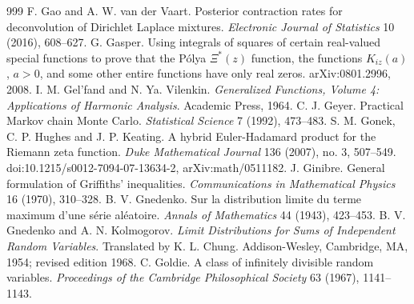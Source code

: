 \begin{thebibliography}{999}
 F. Gao and A. W. van der Vaart. Posterior contraction rates for deconvolution of Dirichlet Laplace mixtures. \emph{Electronic Journal of Statistics} 10 (2016), 608--627.
 G. Gasper. Using integrals of squares of certain real-valued special functions to prove that the P\'olya $\Xi^*(z)$ function, the functions $K_{iz}(a)$, $a>0$, and some other entire functions have only real zeros. arXiv:0801.2996, 2008.
 I. M. Gel'fand and N. Ya. Vilenkin. \emph{Generalized Functions, Volume 4: Applications of Harmonic Analysis}. Academic Press, 1964.
 C. J. Geyer. Practical Markov chain Monte Carlo. \emph{Statistical Science} 7 (1992), 473--483.
 S. M. Gonek, C. P. Hughes and J. P. Keating. A hybrid Euler-Hadamard product for the Riemann zeta function. \emph{Duke Mathematical Journal} 136 (2007), no. 3, 507--549. doi:10.1215/s0012-7094-07-13634-2, arXiv:math/0511182.
 J. Ginibre. General formulation of Griffiths' inequalities. \emph{Communications in Mathematical Physics} 16 (1970), 310--328.
 B. V. Gnedenko. Sur la distribution limite du terme maximum d'une s\'erie al\'eatoire. \emph{Annals of Mathematics} 44 (1943), 423--453.
 B. V. Gnedenko and A. N. Kolmogorov. \emph{Limit Distributions for Sums of Independent Random Variables}. Translated by K. L. Chung. Addison-Wesley, Cambridge, MA, 1954; revised edition 1968.
 C. Goldie. A class of infinitely divisible random variables. \emph{Proceedings of the Cambridge Philosophical Society} 63 (1967), 1141--1143.

\end{thebibliography}
